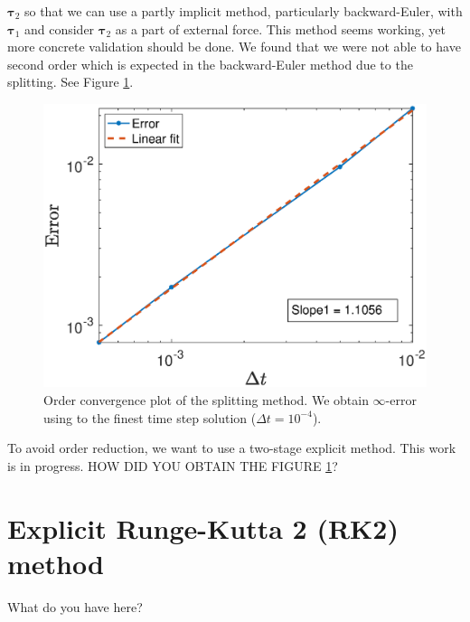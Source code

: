 ${\bm \tau_2}$ so that we can use a partly implicit method, particularly backward-Euler, with ${\bm \tau_1}$ and consider ${\bm \tau_2}$ as a part of external force. This method seems working, yet more concrete validation should be done. We found that we were not able to have second order which is expected in the backward-Euler method due to the splitting. See Figure \ref{fig_infError_vel}.
\begin{figure}[ht]
	\begin{center}
	
		\includegraphics[scale=0.5]{figures/fig_infError_vel.eps}
		\caption{Order convergence plot of the splitting method. We obtain $\infty$-error using to the finest time step solution ($\Delta t = 10^{-4}$).}
	\label{fig_infError_vel}
	\end{center}
\end{figure}
To avoid order reduction, we want to use a two-stage explicit method. This work is in progress.
{\color{red} HOW DID YOU OBTAIN THE FIGURE \ref{fig_infError_vel}?}
\section{Explicit Runge-Kutta 2 (RK2) method}
What do you have here?
